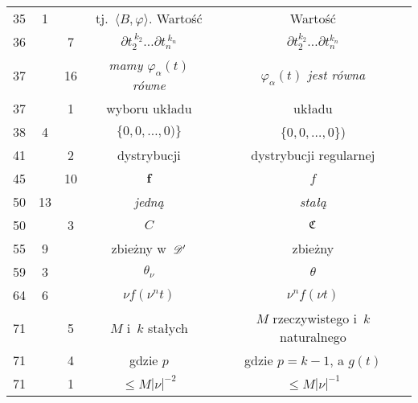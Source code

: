 \documentclass[a4paper,11pt]{article}
\begin{document}
\begin{center}
\begin{tabular}{|c|c|c|c|c|}
    35 & 1 & & tj.~$\langle B, \varphi \rangle$. Wartość & Wartość \\
    36 & & 7 & $\partial t_{ 2 }^{ \: k_{ 2 } } \ldots \partial t_{ n }^{ \: k_{ n } }$
    & $\partial t_{ 2 }^{ k_{ 2 } } \ldots \partial t_{ n }^{ k_{ n } }$ \\
    37 & & 16 & \textit{mamy $\varphi_{ \alpha }( t )$ równe}
    & \textit{$\varphi_{ \alpha }( t )$ jest równa} \\
    37 & & 1 & wyboru układu & układu \\
    38  &  4 & & $\{ 0, 0, \ldots, 0 ) \}$ & $\{ 0, 0, \ldots, 0 \}$) \\
    41  & &  2 & dystrybucji & dystrybucji regularnej \\
    45  & & 10 & $\boldsymbol{f}$ & $f$ \\
    50  & 13 & & \textit{jedną} & \textit{stałą} \\
    50  & &  3 & $C$ & $\mathfrak{C}$ \\
    55  &  9 & & zbieżny w~$\mathcal{D}'$ & zbieżny \\
    59  &  3 & & $\theta_{ \nu }$ & $\theta$ \\
    64  &  6 & & $\nu f( \nu^{ n } t )$ & $\nu^{ n } f( \nu t )$ \\
    71 & & 5 & $M$ i~$k$ stałych & $M$ rzeczywistego i~$k$ naturalnego \\
    71 & & 4 & gdzie $p$ & gdzie $p = k - 1$, a $g( t )$ \\
    71 & & 1 & $\leq M | \nu |^{ -2 }$ & $\leq M | \nu |^{ -1 }$ \\
    \hline
  \end{tabular}

\end{center}
\end{document}
